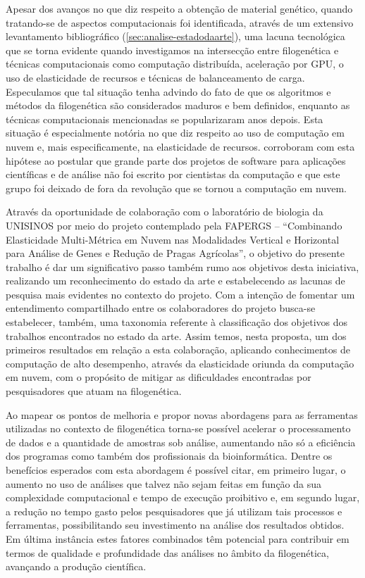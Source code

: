 \documentclass[english,brazilian]{UNISINOSmonografia} %
\begin{document}
Apesar dos avanços no que diz respeito a obtenção de material genético, quando tratando-se de aspectos computacionais foi identificada, através de um extensivo levantamento bibliográfico (\autoref{sec:analise-estadodaarte}), uma lacuna tecnológica que se torna evidente quando investigamos na intersecção entre filogenética e técnicas computacionais como computação distribuída, aceleração por GPU, o uso de elasticidade de recursos e técnicas de balanceamento de carga.
Especulamos que tal situação tenha advindo do fato de que os algoritmos e métodos da filogenética são considerados maduros e bem definidos, enquanto as técnicas computacionais mencionadas se popularizaram anos depois.
Esta situação é especialmente notória no que diz respeito ao uso de computação em nuvem e, mais especificamente, na elasticidade de recursos.
 corroboram com esta hipótese ao postular que grande parte dos projetos de software para aplicações científicas e de análise não foi escrito por cientistas da computação e que este grupo foi deixado de fora da revolução que se tornou a computação em nuvem.



Através da oportunidade de colaboração com o laboratório de biologia da UNISINOS por meio do projeto contemplado pela FAPERGS -- ``Combinando Elasticidade Multi-Métrica em Nuvem nas Modalidades Vertical e Horizontal para Análise de Genes e Redução de Pragas Agrícolas'', o objetivo do presente trabalho é dar um significativo passo também rumo aos objetivos desta iniciativa, realizando um reconhecimento do estado da arte e estabelecendo as lacunas de pesquisa mais evidentes no contexto do projeto.
Com a intenção de fomentar um entendimento compartilhado entre os colaboradores do projeto busca-se estabelecer, também, uma taxonomia referente à classificação dos objetivos dos trabalhos encontrados no estado da arte.
Assim temos, nesta proposta, um dos primeiros resultados em relação a esta colaboração, aplicando conhecimentos de computação de alto desempenho, através da elasticidade oriunda da computação em nuvem, com o propósito de mitigar as dificuldades encontradas por pesquisadores que atuam na filogenética.




Ao mapear os pontos de melhoria e propor novas abordagens para as ferramentas utilizadas no contexto de filogenética torna-se possível acelerar o processamento de dados e a quantidade de amostras sob análise, aumentando não só a eficiência dos programas como também dos profissionais da bioinformática.
Dentre os benefícios esperados com esta abordagem é possível citar, em primeiro lugar, o aumento no uso de análises que talvez não sejam feitas em função da sua complexidade computacional e tempo de execução proibitivo e, em segundo lugar, a redução no tempo gasto pelos pesquisadores que já utilizam tais processos e ferramentas, possibilitando seu investimento na análise dos resultados obtidos.
Em última instância estes fatores combinados têm potencial para contribuir em termos de qualidade e profundidade das análises no âmbito da filogenética, avançando a produção científica.
\end{document}
